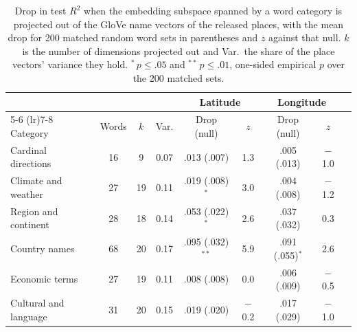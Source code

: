 \documentclass[11pt]{article}
\begin{document}
\begin{table}[!ht]
  \centering
  \caption{Drop in test $R^2$ when the embedding subspace spanned by a word category is projected out of the GloVe name vectors of the released places, with the mean drop for 200 matched random word sets in parentheses and $z$ against that null. $k$ is the number of dimensions projected out and Var.\ the share of the place vectors' variance they hold. $^{*}$\,$p \le .05$ and $^{**}$\,$p \le .01$, one-sided empirical $p$ over the 200 matched sets.}
  \label{tab:semantic_ablation}
  \small
  \setlength{\tabcolsep}{4pt}
  \begin{tabular}{lcccccccc}
    \toprule
    & & & & \multicolumn{2}{c}{Latitude} & \multicolumn{2}{c}{Longitude} \\
    \cmidrule(lr){5-6} \cmidrule(lr){7-8}
    Category & Words & $k$ & Var. & Drop (null) & $z$ & Drop (null) & $z$ \\
    \midrule
    Cardinal directions & 16 & 9 & 0.07 & .013 (.007) & 1.3 & .005 (.013) & $-$1.0 \\
    Climate and weather & 27 & 19 & 0.11 & .019 (.008)$^{*}$ & 3.0 & .004 (.008) & $-$1.2 \\
    Region and continent & 28 & 18 & 0.14 & .053 (.022)$^{*}$ & 2.6 & .037 (.032) & 0.3 \\
    Country names & 68 & 20 & 0.17 & .095 (.032)$^{**}$ & 5.9 & .091 (.055)$^{*}$ & 2.6 \\
    Economic terms & 27 & 19 & 0.11 & .008 (.008) & 0.0 & .006 (.009) & $-$0.5 \\
    Cultural and language & 31 & 20 & 0.15 & .019 (.020) & $-$0.2 & .017 (.029) & $-$1.0 \\
    \bottomrule
  \end{tabular}
\end{table}
\end{document}
